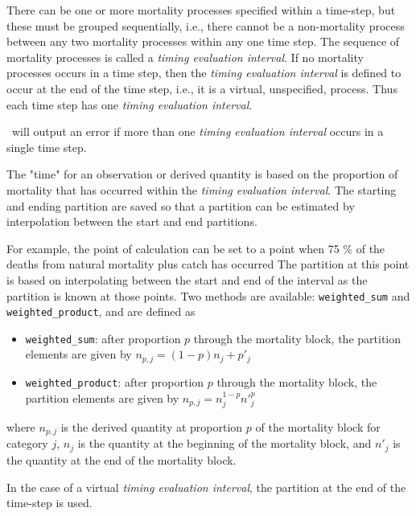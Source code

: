 There can be one or more mortality processes specified within a time-step, but these must be grouped sequentially, i.e., there cannot be a non-mortality process between any two mortality processes within any one time step. The sequence of mortality processes is called a \emph{timing evaluation interval}. If no mortality processes occurs in a time step, then the \emph{timing evaluation interval} is defined to occur at the end of the time step, i.e., it is a virtual, unspecified,  process. Thus  each time step has one \emph{timing evaluation interval}.

\CNAME\ will output an error if more than one \textit{timing evaluation interval} occurs in a single time step.

The "time" for an observation or derived quantity is based on the proportion of mortality that has occurred within the \textit{timing evaluation interval}. The starting and ending partition are saved so that a partition can be estimated by  interpolation between the start and end partitions.

For example, the point of calculation can be set to a point  when 75 \% of the deaths from natural mortality plus catch has occurred The partition at this point is based on interpolating between the start and end of the interval as the partition is known at those points.  Two  methods are available: \texttt{weighted\_sum} and \texttt{weighted\_product}, and are defined as

\begin{itemize}
	\item \texttt{weighted\_sum}: after proportion $p$ through the mortality block, the partition elements are given by $n_{p,j} = (1 - p)n_j + p'_j$

	\item \texttt{weighted\_product}: after proportion $p$ through the mortality block, the partition elements are given by $n_{p,j} = n_j^{1-p} n'^p_j$
\end{itemize}

where $n_{p,j}$ is the derived quantity at proportion $p$ of the mortality block for category $j$, $n_j$ is the quantity at the beginning of the mortality block, and $n'_j$ is the quantity at the end of the mortality block.

In the case of a virtual \textit{timing evaluation interval}, the partition at the end of the time-step is used.


